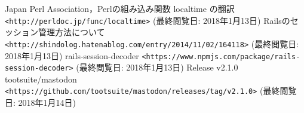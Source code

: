 \documentclass[10pt, a4paper]{jreport}
\begin{document}
\begin{thebibliography}{n}
 Japan Perl Association，Perlの組み込み関数 localtime の翻訳 \verb|<http://perldoc.jp/func/localtime>| (最終閲覧日: 2018年1月13日)
 Railsのセッション管理方法について \verb|<http://shindolog.hatenablog.com/entry/2014/11/02/164118>| (最終閲覧日: 2018年1月13日)
 rails-session-decoder \verb|<https://www.npmjs.com/package/rails-session-decoder>| (最終閲覧日: 2018年1月13日)
 Release v2.1.0  tootsuite/mastodon \verb|<https://github.com/tootsuite/mastodon/releases/tag/v2.1.0>| (最終閲覧日: 2018年1月14日)

\end{thebibliography}

\end{document}
